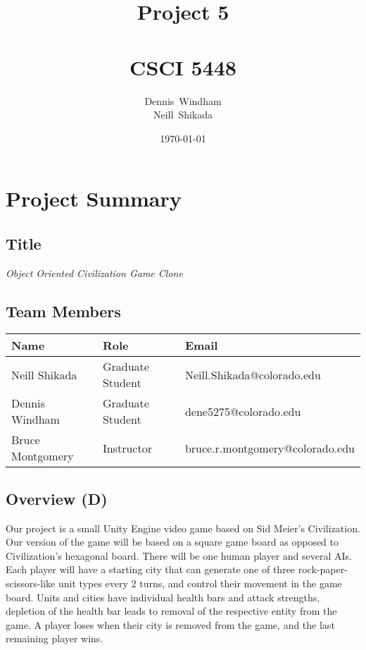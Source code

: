 \documentclass[11pt]{amsart}
\def \fnamea{Dennis}
\def \fnameb{Neill}
\def \lnamea{Windham}
\def \lnameb{Shikada}
\def \class{CSCI 5448}
\def \hwnum{5} %
\def \assgn{Project \hwnum}
\begin{document}
\author[\lnamea]{\fnamea\ \lnamea\\\fnameb\ \lnameb}
\date{\today}
\title[\assgn]{\assgn \\ \ \\\class}
\maketitle
\tableofcontents

\newpage
\section*{\textbf{Project Summary}}
\subsection*{Title}
\begin{center}
    \textit{Object Oriented Civilization Game Clone}
\end{center}

\subsection*{Team Members} \phantom{}

\begin{table}[htbp]
    \begin{tabularx}{\textwidth}{l|l|l}
        \textbf{Name}    & \textbf{Role} & \textbf{Email} \\
        \hline
        Neill Shikada    & Graduate Student & Neill.Shikada@colorado.edu
        \\
        Dennis Windham   & Graduate Student & dene5275@colorado.edu  \\
        Bruce Montgomery & Instructor & bruce.r.montgomery@colorado.edu 
    \end{tabularx}
\end{table}

\subsection*{Overview (D)} \phantom{}

Our project is a small Unity Engine video game based on Sid Meier's Civilization. Our version of the game will be based on a square game board as opposed to Civilization's hexagonal board. There will be one human player and several AIs. Each player will have a starting city that can generate one of three rock-paper-scissors-like unit types every 2 turns, and control their movement in the game board. Units and cities have individual health bars and attack strengths, depletion of the health bar leads to removal of the respective entity from the game. A player loses when their city is removed from the game, and the last remaining player wins.
\end{document}
